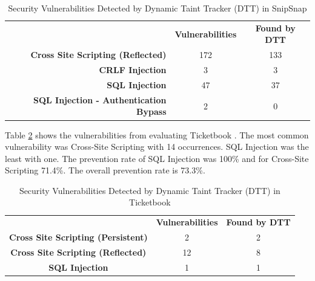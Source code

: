 \begin{table}[!hbt]
  \centering
  \caption{Security Vulnerabilities Detected by Dynamic Taint Tracker (DTT) in SnipSnap}
  \label{table:SnipSnapTable}
  \begin{tabular}{rcc}
    & \textbf{Vulnerabilities} & \textbf{Found by DTT} \\
    \textbf{Cross Site Scripting (Reflected)}      & 172           & 133  \\
    \textbf{CRLF Injection}                        & 3             & 3    \\
    \textbf{SQL Injection}                         & 47            & 37   \\
    \textbf{SQL Injection - Authentication Bypass} & 2             & 0       
  \end{tabular}
\end{table}

Table \ref{table:Ticketbook} shows the vulnerabilities from evaluating Ticketbook \parencite{ticketbook}. The most common vulnerability was Cross-Site Scripting with 14 occurrences. SQL Injection was the least with one. The prevention rate of SQL Injection was 100\% and for Cross-Site Scripting 71.4\%. The overall prevention rate is 73.3\%.

\begin{table}[!hbt]
  \centering
  \caption{Security Vulnerabilities Detected by Dynamic Taint Tracker (DTT) in Ticketbook}
  \label{table:Ticketbook}
  \begin{tabular}{ccc}
    & \textbf{Vulnerabilities} & \textbf{Found by DTT} \\
    \textbf{Cross Site Scripting (Persistent)} & 2             & 2 \\
    \textbf{Cross Site Scripting (Reflected)}  & 12            & 8 \\
    \textbf{SQL Injection}                     & 1             & 1
  \end{tabular}
\end{table}